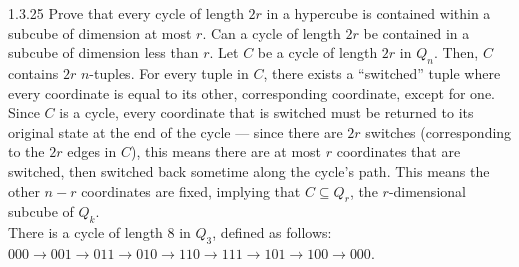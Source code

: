 \documentclass[9pt]{extarticle}
\begin{document}
  \begin{problem}{1.3.25}
    Prove that every cycle of length $2r$ in a hypercube is contained within a subcube of dimension at most $r$. Can a cycle of length $2r$ be contained in a subcube of dimension less than $r$.
    \tcblower
    Let $C$ be a cycle of length $2r$ in $Q_n$. Then, $C$ contains $2r$ $n$-tuples. For every tuple in $C$, there exists a ``switched'' tuple where every coordinate is equal to its other, corresponding coordinate, except for one. Since $C$ is a cycle, every coordinate that is switched must be returned to its original state at the end of the cycle --- since there are $2r$ switches (corresponding to the $2r$ edges in $C$), this means there are at most $r$ coordinates that are switched, then switched back sometime along the cycle's path. This means the other $n-r$ coordinates are fixed, implying that $C\subseteq Q_r$, the $r$-dimensional subcube of $Q_k$.\\

    There is a cycle of length $8$ in $Q_3$, defined as follows: $000 \rightarrow 001 \rightarrow 011 \rightarrow 010 \rightarrow 110 \rightarrow 111 \rightarrow 101 \rightarrow 100 \rightarrow 000$.
  \end{problem}
\end{document}
